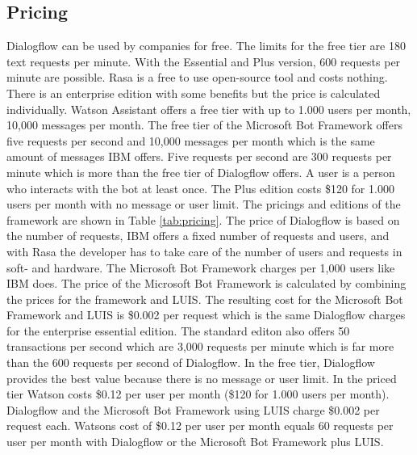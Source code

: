 \subsection*{Pricing} \label{sec:pricing}
Dialogflow can be used by companies for free.
The limits for the free tier are 180 text requests per minute.
With the Essential and Plus version, 600 requests per minute are possible.
Rasa is a free to use open-source tool and costs nothing.
There is an enterprise edition with some benefits but the price
is calculated individually.
Watson Assistant offers a free tier with up to 1.000 users per month, 
10,000 messages per month.
The free tier of the Microsoft Bot Framework offers five requests per second and 
10,000 messages per month which is the same amount of messages IBM offers.
Five requests per second are 300 requests per minute which is more than the 
free tier of Dialogflow offers.
A user is a person who interacts with the bot at least once.
The Plus edition costs \$120 for 1.000 users per month with
no message or user limit.
The pricings and editions of the framework are shown in Table \ref{tab:pricing}.
The price of Dialogflow is based on the number of requests,
IBM offers a fixed number of requests and users, and with Rasa the developer has
to take care of the number of users and requests in soft- and hardware.
The Microsoft Bot Framework charges per 1,000 users like IBM does.
The price of the Microsoft Bot Framework is calculated by combining the prices 
for the framework and LUIS.
The resulting cost for the Microsoft Bot Framework and LUIS is \$0.002 per request 
which is the same Dialogflow charges for the enterprise essential edition.  
The standard editon also offers 50 transactions per second which 
are 3,000 requests per minute which is far more than the 600 requests per second of 
Dialogflow.
In the free tier, Dialogflow provides the best value because there is no message or user limit.
In the priced tier Watson costs \$0.12 per user per month (\$120 for 1.000 users per month).
Dialogflow and the Microsoft Bot Framework using LUIS charge \$0.002 per request each.
Watsons cost of \$0.12 per user per month equals 60 requests per user per month with Dialogflow or 
the Microsoft Bot Framework plus LUIS.


